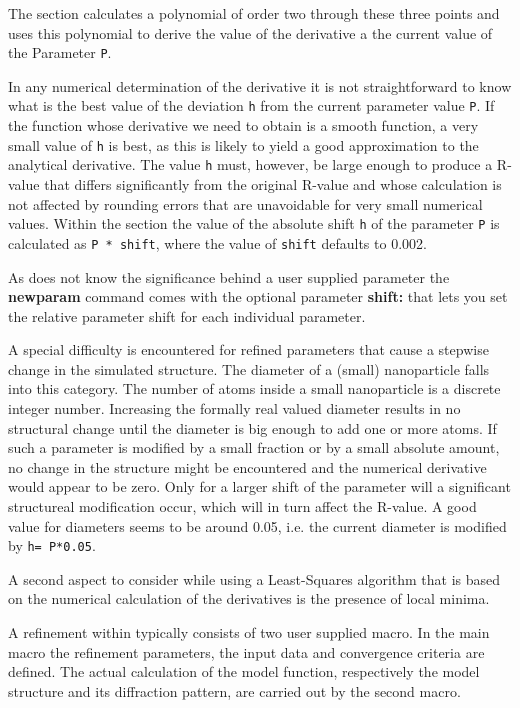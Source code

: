 The \Refine section calculates a polynomial of order two through these three 
points and uses this polynomial to derive the value of the derivative a the
current value of the Parameter {\tt P}. 

In any numerical determination of the derivative it is not straightforward 
to know what is the best value of the deviation {\tt h} from the current 
parameter value {\tt P}. If the function whose derivative we need to obtain
is a smooth function, a very small value of {\tt h} is best, as this is 
likely to yield a good approximation to the analytical derivative. The 
value {\tt h} must, however, be large enough to produce a R-value that 
differs significantly from the original R-value and whose calculation 
is not affected by rounding errors that are unavoidable for very small 
numerical values. Within the \Refine section the value of the absolute 
shift {\tt h} of the parameter {\tt P} is calculated as
{\tt P * shift}, where the value of {\tt shift} defaults to 0.002. 

As \Refine does not know the significance behind a user supplied parameter
the {\bf newparam} command comes with the optional parameter {\bf shift:}
that lets you set the relative parameter shift for each individual parameter.

A special difficulty is encountered for refined parameters that cause a
stepwise change in the simulated structure. The diameter of a (small) 
nanoparticle falls into this category. The number of atoms inside a
small nanoparticle is a discrete integer number. Increasing the 
formally real valued diameter results in no structural change until the 
diameter is big enough to add one or more atoms. If such a parameter
is modified by a small fraction or by a small absolute amount, no 
change in the structure might be encountered and the numerical derivative 
would appear to be zero. Only for a larger shift of the parameter will 
a significant structureal modification occur, which will in turn affect 
the R-value. A good value for diameters seems to be around 0.05, i.e.
the current diameter is modified by {\tt h= P*0.05}.

A second aspect to consider while using a Least-Squares algorithm that 
is based on the numerical calculation of the derivatives is the presence
of local minima.

A refinement within \Refine typically consists of two user supplied macro. In 
the main macro the refinement parameters, the input data and convergence 
criteria are defined. The actual calculation of the model function, respectively
the model structure and its diffraction pattern, are carried out by the second
macro.

